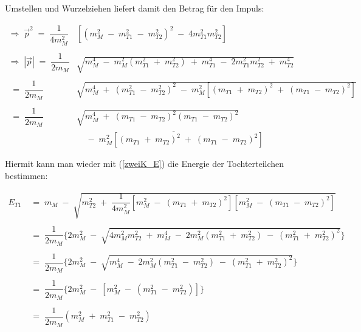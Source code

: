 \documentclass[
a4paper,                                %
twoside,                                %
BCOR1.4cm,                      %
ngerman,                                %
10pt,                           %
headings=normal,                %
headsepline,                    %
clearplainpage, %
final,                                  %
div=14,
parskip=full
]{scrbook}
\begin{document}
Umstellen und Wurzelziehen liefert damit den Betrag f\"ur den Impuls:

\begin{align}
\Rightarrow\;
	\vec{p}^{2}
\;=\;
	\dfrac{1}{4 m_{M}^{2}}
	&\left[
		\left(
			m_{M}^{2}\;-\;m_{T1}^{2}\;-\;m_{T2}^{2}
		\right)^{2}
		\;-\;
		4 m_{T1}^{2} m_{T2}^{2}
	\right]
\nonumber
\\
\nonumber
\\
\Rightarrow\;
	|\vec{p}|
\;=\;
	\dfrac{1}{2 m_{M}}
	&\sqrt{
		m_{M}^{4}\;-\;
		m_{M}^{2}
		\left(
			m_{T1}^{2}\;+\;m_{T2}^{2}
		\right)
		\;+\;m_{T1}^{4}
		\;-\;2 m_{T1}^{2} m_{T2}^{2}
		\;+\;m_{T2}^{4}
		}
\nonumber	
\\
\nonumber
\\
\;=\;
	\dfrac{1}{2 m_{M}}
	&\sqrt{
		m_{M}^{4}
		\;+\;\left(
			m_{T1}^{2}\;-\;m_{T2}^{2}
		\right)^{2}
		\;-\;m_{M}^{2}
		\left[
			\left(
				m_{T1}\;+\;m_{T2}
			\right)^{2}
			\;+\;
			\left(
				m_{T1}\;-\;m_{T2}
			\right)^{2}
		\right]
		}
\nonumber
\\
\nonumber
\\
\;=\;
	\dfrac{1}{2 m_{M}}
	&\sqrt{
		m_{M}^{4}
		\;+\;\left(
			m_{T1}\;-\;m_{T2}
		\right)^{2}
		\left(
			m_{T1}\;-\;m_{T2}
		\right)^{2}
	}
\nonumber
\\
&\;\;\;\overline{
		\;-\;m_{M}^{2}
		\left[
			\left(
				m_{T1}\;+\;m_{T2}
			\right)^{2}
			\;+\;
			\left(
				m_{T1}\;-\;m_{T2}
			\right)^{2}
		\right]
		}
\nonumber
\end{align}

Hiermit kann man wieder mit (\ref{zweiK_E}) die Energie der Tochterteilchen bestimmen:

\begin{align}
	E_{T1}
\;&=\;
	m_{M}\;-\;
	\sqrt{
		m_{T2}^{2}
		\;+\;\dfrac{1}{4 m_{M}^{2}}
		\left[
			m_{M}^{2}\;-\;
			\left(
				m_{T1}\;+\;m_{T2}
			\right)^{2}
		\right]
		\left[
				m_{M}^{2}\;-\;
				\left(
					m_{T1}\;-\;m_{T2}
				\right)^{2}
			\right]	
		}
\nonumber
\\
\nonumber
\\	
\;&=\;
	\dfrac{1}{2 m_{M}}
		\bigg\{
			2 m_{M}^{2}\;-\;
			\sqrt{4 m_{M}^{2} m_{T2}^{2}\;+\;m_{M}^{4}
			\;-\;
			2 m_{M}^{2}
			\left(
				m_{T1}^{2}\;+\;m_{T2}^{2}
			\right)
			\;-\;
			\left(
				m_{T1}^{2}\;+\;m_{T2}^{2}
			\right)^{2}}
		\bigg\}
\nonumber
\\
\nonumber
\\	
\;&=\;
	\dfrac{1}{2 m_{M}}
		\bigg\{
			2 m_{M}^{2}\;-\;
			\sqrt{
				m_{M}^{4}
				\;-\;2 m_{M}^{2}
				\left(
					m_{T1}^{2}\;-\;m_{T2}^{2}
				\right)
				\;-\;
				\left(
					m_{T1}^{2}\;+\;m_{T2}^{2}
				\right)^{2}
			}
		\bigg\}
\nonumber
\\
\nonumber
\\	
\;&=\;
	\dfrac{1}{2 m_{M}}
	\bigg\{
		2 m_{M}^{2}\;-\;
		\left[
			m_{M}^{2}\;-\;
			\left(
				m_{T1}^{2}\;-\;m_{T2}^{2}
			\right)
		\right]
	\bigg\}
\nonumber
\\
\nonumber
\\	
\;&=\;
	\dfrac{1}{2 m_{M}}
	\left(
		m_{M}^{2}\;+\;m_{T1}^{2}\;-\;m_{T2}^{2}
	\right)
\end{align}
\end{document}
